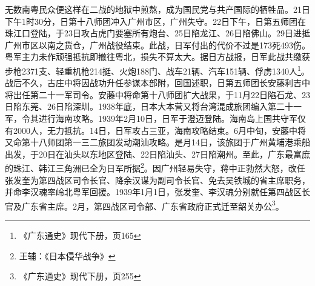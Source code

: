 无数南粤民众便这样在二战的地狱中煎熬，成为国民党与共产国际的牺牲品。21日下午1时30分，日第十八师团冲入广州市区，广州失守。22日下午，日第五师团在珠江口登陆，于23日攻占虎门要塞所有炮台、25日陷龙江、26日陷佛山。29日进抵广州市区以南之货仓，广州战役结束。此战，日军付出的代价不过是173死493伤。粤军主力未作顽强抵抗即撤往粤北，损失不算太大。据日方战报，日军此战共缴获步枪2371支、轻重机枪214挺、火炮188门、战车21辆、汽车151辆、俘虏1340人\footnote{《广东通史》现代下册，页165}。战后不久，古庄中将因战功升任参谋本部附，回国述职，日第五师团长安藤利吉中将出任第二十一军司令。安藤中将命第十八师团扩大战果，于11月22日陷石龙、23日陷东莞、26日陷深圳。1938年底，日本大本营又将台湾混成旅团编入第二十一军，令其进行海南攻略。1939年2月10日，日军于澄迈登陆。海南岛上国共守军仅有2000人，无力抵抗。14日，日军攻占三亚，海南攻略结束。6月中旬，安藤中将又命第十八师团第一三二旅团发动潮汕攻略。是月14日，该旅团于广州黄埔港乘船出发，于20日在汕头以东地区登陆、22日陷汕头、27日陷潮州。至此，广东最富庶的珠江、韩江三角洲已全为日军所据\footnote{王辅：《日本侵华战争》}。因广州轻易失守，蒋中正勃然大怒，改任张发奎为第四战区司令长官、降余汉谋为副司令长官、免去吴铁城的省主席职务，并命李汉魂率岭北粤军回援。1939年1月1日，张发奎、李汉魂分别就任第四战区长官及广东省主席。2月，第四战区司令部、广东省政府正式迁至韶关办公\footnote{《广东通史》现代下册，页255}。

